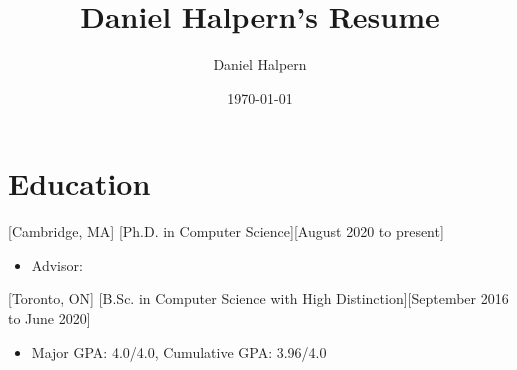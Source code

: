 \documentclass{article}
\title{Daniel Halpern's Resume}
\author{Daniel Halpern}
\date{\today}
\newcommand{\link}[2]{\iftoggle{uselinks}{\href{#1}{#2}}{#2}\xspace}
\begin{document}

    \makecvtitle %

    \section{Education}

    [Cambridge, MA]
    [Ph.D. in Computer Science][August 2020 to present]
    \begin{itemize}
        \item Advisor: \link{http://procaccia.info}{Ariel Procaccia}
    \end{itemize}

    [Toronto, ON]
    [B.Sc. in Computer Science with High Distinction][September 2016 to June 2020]
    \begin{itemize}
        \item Major GPA: 4.0/4.0, Cumulative GPA: 3.96/4.0
    \end{itemize}
\end{document}
